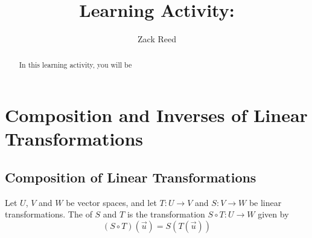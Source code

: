 \documentclass{ximera}
\author{Zack Reed}
\title{Learning Activity: }
\begin{document}
\begin{abstract}

    In this learning activity, you will be 
\end{abstract}
\maketitle
 
\section*{Composition and Inverses of Linear Transformations}
 
\subsection*{Composition of Linear Transformations}
\begin{definition}\label{def:compoflintrans} Let $U$, $V$ and $W$ be vector spaces, and let $T:U\rightarrow V$ and $S:V\rightarrow W$ be linear transformations.  The  of $S$ and $T$ is the transformation $S\circ T:U\rightarrow W$ given by
$$(S\circ T)(\vec{u})=S(T(\vec{u}))$$
\end{definition}
 
\end{document}
